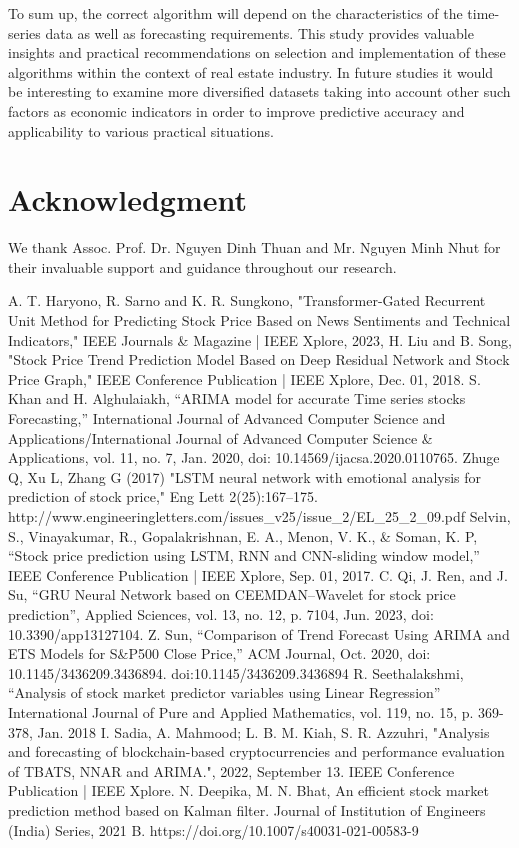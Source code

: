 \documentclass[conference]{IEEEtran}
\begin{document}
\begin{enumerate}
To sum up, the correct algorithm will depend on the characteristics of the time-series data as well as forecasting requirements. This study provides valuable insights and practical recommendations on selection and implementation of these algorithms within the context of real estate industry. In future studies it would be interesting to examine more diversified datasets taking into account other such factors as economic indicators in order to improve predictive accuracy and applicability to various practical situations.
\section*{Acknowledgment}

We thank Assoc. Prof. Dr. Nguyen Dinh Thuan and Mr. Nguyen Minh Nhut for their invaluable support and guidance throughout our research.



\begin{thebibliography}{00}
A. T. Haryono, R. Sarno and K. R. Sungkono, "Transformer-Gated Recurrent Unit Method for Predicting Stock Price Based on News Sentiments and Technical Indicators," IEEE Journals \& Magazine | IEEE Xplore, 2023, 
H. Liu and B. Song, "Stock Price Trend Prediction Model Based on Deep Residual Network and Stock Price Graph," IEEE Conference Publication | IEEE Xplore, Dec. 01, 2018. 
S. Khan and H. Alghulaiakh, “ARIMA model for accurate Time series stocks Forecasting,” International Journal of Advanced Computer Science and Applications/International Journal of Advanced Computer Science \& Applications, vol. 11, no. 7, Jan. 2020, doi: 10.14569/ijacsa.2020.0110765.
Zhuge Q, Xu L, Zhang G (2017) "LSTM neural network with emotional analysis for prediction of stock price," Eng Lett 2(25):167–175. http://www.engineeringletters.com/issues\_v25/issue\_2/EL\_25\_2\_09.pdf
Selvin, S., Vinayakumar, R., Gopalakrishnan, E. A., Menon, V. K., \& Soman, K. P, “Stock price prediction using LSTM, RNN and CNN-sliding window model,” IEEE Conference Publication | IEEE Xplore, Sep. 01, 2017. 
C. Qi, J. Ren, and J. Su, “GRU Neural Network based on CEEMDAN–Wavelet for stock price prediction”, Applied Sciences, vol. 13, no. 12, p. 7104, Jun. 2023, doi: 10.3390/app13127104.
Z. Sun, “Comparison of Trend Forecast Using ARIMA and ETS Models for S\&P500 Close Price,” ACM Journal, Oct. 2020, doi: 10.1145/3436209.3436894. 
doi:10.1145/3436209.3436894
R. Seethalakshmi, “Analysis of stock market predictor variables using Linear Regression” International Journal of Pure and Applied Mathematics, vol. 119, no. 15, p. 369-378, Jan. 2018
 I. Sadia, A. Mahmood; L. B. M. Kiah, S. R. Azzuhri, "Analysis and forecasting of blockchain-based cryptocurrencies and performance evaluation of TBATS, NNAR and ARIMA.", 2022, September 13. IEEE Conference Publication | IEEE Xplore. 
 N. Deepika, M. N. Bhat,  An efficient stock market prediction method based on Kalman filter. Journal of Institution of Engineers (India) Series, 2021 B. https://doi.org/10.1007/s40031-021-00583-9


\end{thebibliography}
\end{enumerate}
\end{document}
